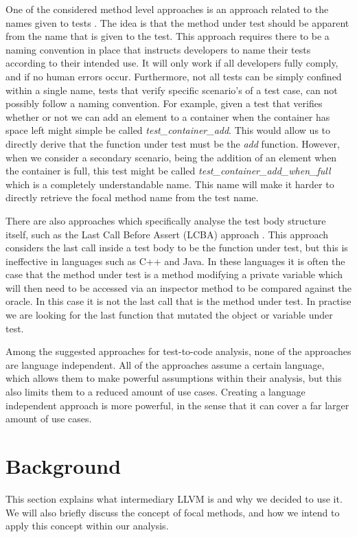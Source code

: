 \documentclass[11pt]{article}
\begin{document}
\begin{multicols}{2}
One of the considered method level approaches is an approach related to the names given to tests \cite{van2009establishing}. The idea is that the method under test should be apparent from the name that is given to the test. This approach requires there to be a naming convention in place that instructs developers to name their tests according to their intended use. It will only work if all developers fully comply, and if no human errors occur. Furthermore, not all tests can be simply confined within a single name, tests that verify specific scenario's of a test case, can not possibly follow a naming convention. For example, given a test that verifies whether or not we can add an element to a container when the container has space left might simple be called \textit{test\_container\_add}. This would allow us to directly derive that the function under test must be the \textit{add} function. However, when we consider a secondary scenario, being the addition of an element when the container is full, this test might be called \textit{test\_container\_add\_when\_full} which is a completely understandable name. This name will make it harder to directly retrieve the focal method name from the test name.

There are also approaches which specifically analyse the test body structure itself, such as the Last Call Before Assert (LCBA) approach \cite{van2009establishing}. This approach considers the last call inside a test body to be the function under test, but this is ineffective in languages such as C++ and Java. In these languages it is often the case that the method under test is a method modifying a private variable which will then need to be accessed via an inspector method to be compared against the oracle. In this case it is not the last call that is the method under test. In practise we are looking for the last function that mutated the object or variable under test.

Among the suggested approaches for test-to-code analysis, none of the approaches are language independent. All of the approaches assume a certain language, which allows them to make powerful assumptions within their analysis, but this also limits them to a reduced amount of use cases. Creating a language independent approach is more powerful, in the sense that it can cover a far larger amount of use cases. 

\section{Background}
This section explains what intermediary LLVM is and why we decided to use it. We will also briefly discuss the concept of focal methods, and how we intend to apply this concept within our analysis.


\end{multicols}
\end{document}
